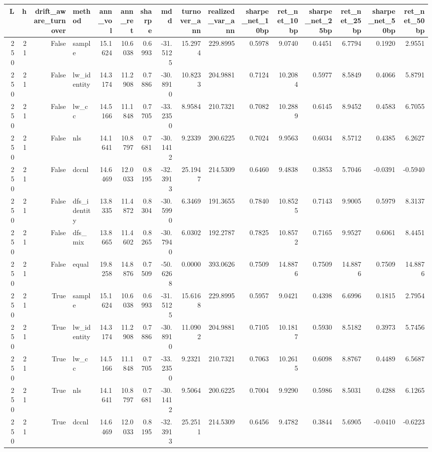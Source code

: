 \begin{tabular}{rrrlrrrrrrrrrrrr}
\toprule
L & h & drift_aware_turnover & method & ann_vol & ann_ret & sharpe & mdd & turnover_ann & realized_var_ann & sharpe_net_10bp & ret_net_10bp & sharpe_net_25bp & ret_net_25bp & sharpe_net_50bp & ret_net_50bp \\
\midrule
250 & 21 & False & sample & 15.1624 & 10.6038 & 0.6993 & -31.5125 & 15.2974 & 229.8995 & 0.5978 & 9.0740 & 0.4451 & 6.7794 & 0.1920 & 2.9551 \\
250 & 21 & False & lw_identity & 14.3174 & 11.2908 & 0.7886 & -30.8910 & 10.8233 & 204.9881 & 0.7124 & 10.2084 & 0.5977 & 8.5849 & 0.4066 & 5.8791 \\
250 & 21 & False & lw_cc & 14.5166 & 11.1848 & 0.7705 & -33.2350 & 8.9584 & 210.7321 & 0.7082 & 10.2889 & 0.6145 & 8.9452 & 0.4583 & 6.7055 \\
250 & 21 & False & nls & 14.1641 & 10.8797 & 0.7681 & -30.1412 & 9.2339 & 200.6225 & 0.7024 & 9.9563 & 0.6034 & 8.5712 & 0.4385 & 6.2627 \\
250 & 21 & False & dccnl & 14.6469 & 12.0033 & 0.8195 & -32.3913 & 25.1947 & 214.5309 & 0.6460 & 9.4838 & 0.3853 & 5.7046 & -0.0391 & -0.5940 \\
250 & 21 & False & dfs_identity & 13.8335 & 11.4872 & 0.8304 & -30.5990 & 6.3469 & 191.3655 & 0.7840 & 10.8525 & 0.7143 & 9.9005 & 0.5979 & 8.3137 \\
250 & 21 & False & dfs_mix & 13.8665 & 11.4602 & 0.8265 & -30.7940 & 6.0302 & 192.2787 & 0.7825 & 10.8572 & 0.7165 & 9.9527 & 0.6061 & 8.4451 \\
250 & 21 & False & equal & 19.8258 & 14.8876 & 0.7509 & -50.6268 & 0.0000 & 393.0626 & 0.7509 & 14.8876 & 0.7509 & 14.8876 & 0.7509 & 14.8876 \\
250 & 21 & True & sample & 15.1624 & 10.6038 & 0.6993 & -31.5125 & 15.6168 & 229.8995 & 0.5957 & 9.0421 & 0.4398 & 6.6996 & 0.1815 & 2.7954 \\
250 & 21 & True & lw_identity & 14.3174 & 11.2908 & 0.7886 & -30.8910 & 11.0902 & 204.9881 & 0.7105 & 10.1817 & 0.5930 & 8.5182 & 0.3973 & 5.7456 \\
250 & 21 & True & lw_cc & 14.5166 & 11.1848 & 0.7705 & -33.2350 & 9.2321 & 210.7321 & 0.7063 & 10.2615 & 0.6098 & 8.8767 & 0.4489 & 6.5687 \\
250 & 21 & True & nls & 14.1641 & 10.8797 & 0.7681 & -30.1412 & 9.5064 & 200.6225 & 0.7004 & 9.9290 & 0.5986 & 8.5031 & 0.4288 & 6.1265 \\
250 & 21 & True & dccnl & 14.6469 & 12.0033 & 0.8195 & -32.3913 & 25.2511 & 214.5309 & 0.6456 & 9.4782 & 0.3844 & 5.6905 & -0.0410 & -0.6223 \\

\end{tabular}
